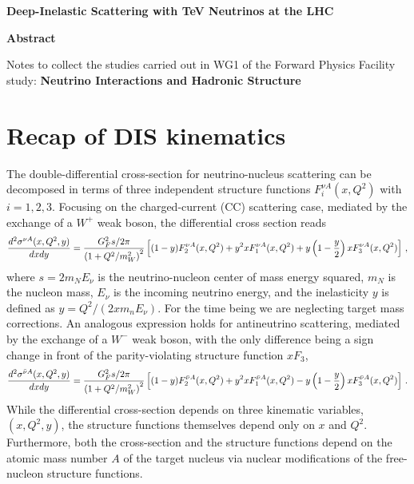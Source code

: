 \documentclass[11pt,a4paper]{article}
\newcommand{\be}{\begin{equation}}
\newcommand{\ee}{\end{equation}}
\newcommand{\lc}{\left[}
\newcommand{\rc}{\right]}
\newcommand{\lp}{\left(}
\newcommand{\rp}{\right)}
\def\frac#1#2{{{#1}\over {#2}}}
\numberwithin{equation}{section}
\numberwithin{figure}{section}
\numberwithin{table}{section}
\begin{document}

\vspace{0.7cm}

\begin{center}
  {\Large \bf Deep-Inelastic Scattering with TeV Neutrinos at the LHC}
\vspace{1.1cm}


\vspace{1.0cm}

{\bf \large Abstract}

\end{center}
Notes to collect the studies
carried out in WG1 of the Forward
Physics Facility study: {\bf  Neutrino Interactions and Hadronic Structure}

\tableofcontents

\section{Recap of DIS kinematics}

The double-differential cross-section for neutrino-nucleus scattering
can be decomposed
in terms of three independent structure functions $F_i^{\nu A}(x,Q^2)$ with $i=1,2,3$.
%
Focusing on the charged-current (CC) scattering case, mediated
by the exchange of a $W^+$ weak boson, the differential
 cross section reads
\be
\label{eq:neutrino_DIS_xsec}
\frac{d^2\sigma^{\nu A}(x,Q^2,y)}{dxdy} =  \frac{G_F^2s/2\pi}{\lp 1+Q^2/m_W^2\rp^2}\lc (1-y)F^{\nu A}_2(x,Q^2) + y^2xF^{\nu A}_1(x,Q^2) + y\lp 1-\frac{y}{2}\rp xF^{\nu A}_3(x,Q^2)\rc  \, ,
\ee
where $s=2m_N E_\nu$ is the neutrino-nucleon center of mass energy squared, $m_N$ is the nucleon mass,
$E_\nu$ is the incoming neutrino energy,
and the inelasticity $y$ is defined as $y=Q^2/(2x m_n E_{\nu})$.
%
For the time being we are neglecting target mass 
corrections.
%
An analogous expression holds for  antineutrino 
scattering, mediated
by the exchange of a $W^-$ weak boson, with the only difference being a sign change
in front of the parity-violating structure function $xF_3$,
\be
\label{eq:antineutrino_DIS_xsec}
\frac{d^2\sigma^{\bar{\nu} A}(x,Q^2,y)}{dxdy} =  \frac{G_F^2s/2\pi}{\lp 1+Q^2/m_W^2\rp^2}\lc (1-y)F^{\bar{\nu} A}_2(x,Q^2) + y^2xF^{\bar{\nu} A}_1(x,Q^2) - y\lp 1-\frac{y}{2}\rp xF^{\bar{\nu} A}_3(x,Q^2)\rc  \, .
\ee
While the differential cross-section depends on three kinematic variables, $(x,Q^2,y)$,
the structure functions themselves depend only on $x$ and $Q^2$.
%
Furthermore, both the cross-section and the structure functions depend
on the atomic mass number $A$ of the target nucleus via nuclear modifications of the free-nucleon
structure functions.
\end{document}
